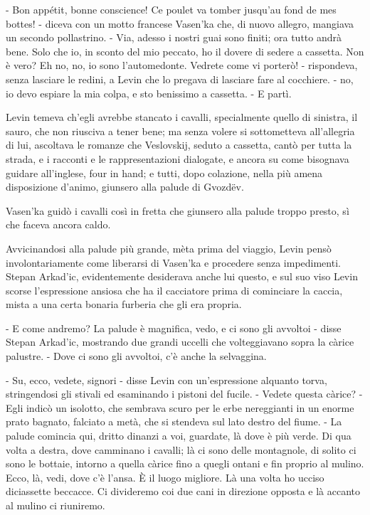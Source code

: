 - Bon appétit, bonne conscience! Ce poulet va tomber jusqu'au fond de mes bottes! - diceva con un motto francese Vasen'ka che, di nuovo allegro, mangiava un secondo pollastrino. - Via, adesso i nostri guai sono finiti; ora tutto andrà bene. Solo che io, in sconto del mio peccato, ho il dovere di sedere a cassetta. Non è vero? Eh no, no, io sono l'automedonte. Vedrete come vi porterò! - rispondeva, senza lasciare le redini, a Levin che lo pregava di lasciare fare al cocchiere. - no, io devo espiare la mia colpa, e sto benissimo a cassetta. - E partì. 

Levin temeva ch'egli avrebbe stancato i cavalli, specialmente quello di sinistra, il sauro, che non riusciva a tener bene; ma senza volere si sottometteva all'allegria di lui, ascoltava le romanze che Veslovskij, seduto a cassetta, cantò per tutta la strada, e i racconti e le rappresentazioni dialogate, e ancora su come bisognava guidare all'inglese, four in hand; e tutti, dopo colazione, nella più amena disposizione d'animo, giunsero alla palude di Gvozdëv. 

\label{x-5} 

Vasen'ka guidò i cavalli così in fretta che giunsero alla palude troppo presto, sì che faceva ancora caldo. 

Avvicinandosi alla palude più grande, mèta prima del viaggio, Levin pensò involontariamente come liberarsi di Vasen'ka e procedere senza impedimenti. Stepan Arkad'ic, evidentemente desiderava anche lui questo, e sul suo viso Levin scorse l'espressione ansiosa che ha il cacciatore prima di cominciare la caccia, mista a una certa bonaria furberia che gli era propria. 

- E come andremo? La palude è magnifica, vedo, e ci sono gli avvoltoi - disse Stepan Arkad'ic, mostrando due grandi uccelli che volteggiavano sopra la càrice palustre. - Dove ci sono gli avvoltoi, c'è anche la selvaggina. 

- Su, ecco, vedete, signori - disse Levin con un'espressione alquanto torva, stringendosi gli stivali ed esaminando i pistoni del fucile. - Vedete questa càrice? - Egli indicò un isolotto, che sembrava scuro per le erbe nereggianti in un enorme prato bagnato, falciato a metà, che si stendeva sul lato destro del fiume. - La palude comincia qui, dritto dinanzi a voi, guardate, là dove è più verde. Di qua volta a destra, dove camminano i cavalli; là ci sono delle montagnole, di solito ci sono le bottaie, intorno a quella càrice fino a quegli ontani e fin proprio al mulino. Ecco, là, vedi, dove c'è l'ansa. È il luogo migliore. Là una volta ho ucciso diciassette beccacce. Ci divideremo coi due cani in direzione opposta e là accanto al mulino ci riuniremo. 

